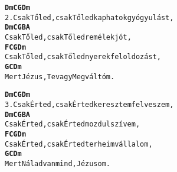 \newpage
{}
\kottastart
{}
\kottaend
\begin{minipage}{\textwidth}
\begin{alltt}
\textbf{         Dm          C   G                Dm}
2. Csak Tőled, csak Tőled kaphatok gyógyulást,
\textbf{         Dm          C   G     B   A}
   Csak Tőled, csak Tőled remélek jót,
\textbf{         F           C   G          Dm}
   Csak Tőled, csak Tőled nyerek feloldozást,
\textbf{         G         C          Dm}
   Mert Jézus, Te vagy Megváltóm.
\end{alltt}
\vspace{0.0cm}
\versszakspacing
\end{minipage}
\begin{minipage}{\textwidth}
\begin{alltt}
\textbf{        Dm          C    G                 Dm}
3. Csak Érted, csak Érted keresztem felveszem,
\textbf{        Dm          C    G    B      A}
   Csak Érted, csak Érted mozdul szívem,
\textbf{        F           C    G         Dm}
   Csak Érted, csak Érted terheim vállalom,
\textbf{         G         C         Dm}
   Mert Nálad van mind, Jézusom.
\end{alltt}
\vspace{0.0cm}
\versszakspacing
\end{minipage}
